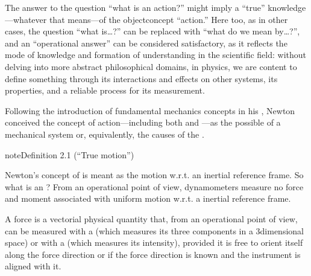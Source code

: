 \documentclass[letterpaper,10pt,english]{jupyterBook}
\begin{document}
\sphinxAtStartPar
{}%
\begin{footnote}[1]\sphinxAtStartFootnote
The answer to the question “what is an action?” might imply a “true” knowledge—whatever that means—of the object\sphinxhyphen{}concept “action.” Here too, as in other cases, the question “what is…?” can be replaced with “what do we mean by…?”, and an “operational answer” can be considered satisfactory, as it reflects the mode of knowledge and formation of understanding in the scientific field: without delving into more abstract philosophical domains, in physics, we are content to define something through its interactions and effects on other systems, its properties, and a reliable process for its measurement.
%
\end{footnote} Following the introduction of fundamental mechanics concepts in his , Newton conceived the concept of action—including both  and —as the possible  of a mechanical system or, equivalently, the causes of the  {\hyperref[\detokenize{ch/kinematics-relative:classical-mechanics-kinematics-relative}]{}}.
\label{ch/actions:def:true-motion}
\begin{sphinxadmonition}{note}{Definition 2.1 (“True motion”)}



\sphinxAtStartPar
Newton’s concept of  is meant as the motion w.r.t. an inertial reference frame. So what is an {\hyperref[\detokenize{ch/dynamics-principles:classical-mehcanics-dynamics-principles-inertial-ref-frame}]{}}? From an operational point of view, dynamometers measure no force and moment associated with uniform motion w.r.t. a inertial reference frame.
\end{sphinxadmonition}

\sphinxAtStartPar
A force is a vectorial physical quantity that, from an operational point of view, can be measured with a  (which measures its three components in a 3\sphinxhyphen{}dimensional space) or with a  (which measures its intensity), provided it is free to orient itself along the force direction or if the force direction is known and the instrument is aligned with it.
\end{document}
